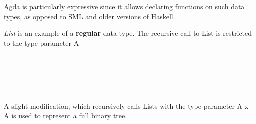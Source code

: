 \documentclass[12pt,twoside,notitlepage]{report}
\begin{document}
Agda is particularly expressive since it allows declaring functions on such data types, as opposed to SML and older versions of Haskell.

\textit{List} is an example of a \textbf{regular} data type. The recursive call to List is restricted to the type parameter A

\begin{code}
\\
\>  \AgdaSymbol{(} \AgdaSymbol{:} \AgdaSymbol{)} \AgdaSymbol{:}  \<%
\\
\>[0]\<[2]%
\>[2]\AgdaInductiveConstructor{[]} \AgdaSymbol{:}  \<%
\\
\>[0]\<[2]%
\>[2] \AgdaSymbol{:}       \<%
\\
\end{code}

A slight modification, which recursively calls Lists with the type parameter A x A is used to represent a full binary tree.\cite{nested}

\begin{code}
\\
\>  \AgdaSymbol{(} \AgdaSymbol{:} \AgdaSymbol{)} \AgdaSymbol{:}  \<%
\\
\>[0]\<[2]%
\>[2] \AgdaSymbol{:}  \<%
\\
\>[0]\<[2]%
\>[2] \AgdaSymbol{:}    \AgdaSymbol{(}  \AgdaSymbol{)}   \<%
\\
\end{code}

\begin{code}
\\
\> \AgdaSymbol{:}  \<%
\\
\> \AgdaSymbol{=}   \AgdaSymbol{(} \AgdaSymbol{(} \AgdaInductiveConstructor{,} \AgdaSymbol{)} \AgdaSymbol{(} \AgdaSymbol{((} \AgdaInductiveConstructor{,} \AgdaSymbol{)} \AgdaInductiveConstructor{,} \AgdaSymbol{(} \AgdaInductiveConstructor{,} \AgdaSymbol{))} \AgdaSymbol{))}\<%
\\
\end{code}
\end{document}
